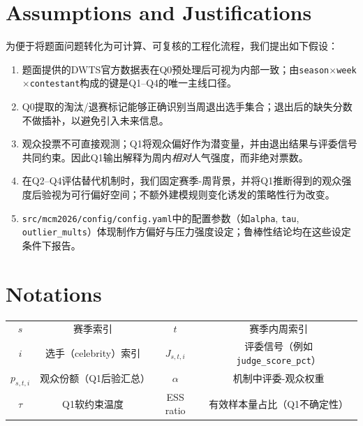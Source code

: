 \newpage%
\section{Assumptions and Justifications}
为便于将题面问题转化为可计算、可复核的工程化流程，我们提出如下假设：

\begin{enumerate}[
	label = (\arabic*),
	itemindent = 0pt,
	labelindent = \parindent,
	labelwidth = 2em,
	labelsep = 5pt,
	leftmargin = 8em]
	\item[\textbf{假设1：}] 题面提供的DWTS官方数据表在Q0预处理后可视为内部一致；由\texttt{season$\times$week$\times$contestant}构成的键是Q1--Q4的唯一主线口径。
	\item[\textbf{假设2：}] Q0提取的淘汰/退赛标记能够正确识别当周退出选手集合；退出后的缺失分数不做插补，以避免引入未来信息。
	\item[\textbf{假设3：}] 观众投票不可直接观测；Q1将观众偏好作为潜变量，并由退出结果与评委信号共同约束。因此Q1输出解释为周内\emph{相对}人气强度，而非绝对票数。
	\item[\textbf{假设4：}] 在Q2--Q4评估替代机制时，我们固定赛季-周背景，并将Q1推断得到的观众强度后验视为可行偏好空间；不额外建模规则变化诱发的策略性行为改变。
	\item[\textbf{假设5：}] \texttt{src/mcm2026/config/config.yaml}中的配置参数（如\texttt{alpha}, \texttt{tau}, \texttt{outlier\_mults}）体现制作方偏好与压力强度设定；鲁棒性结论均在这些设定条件下报告。
\end{enumerate}



\section{Notations}
\begin{center}
	\begin{tabular}{cccc}
		\toprule[1pt] 
		\makebox[0.15\textwidth][c]{Symbol} & \makebox[0.3\textwidth][c]{Description} & \makebox[0.15\textwidth][c]{Symbol} & \makebox[0.3\textwidth][c]{Description} \\  
		\hline
		$s$ & 赛季索引 & $t$ & 赛季内周索引 \\
		$i$ & 选手（celebrity）索引 & $J_{s,t,i}$ & 评委信号（例如\texttt{judge\_score\_pct}） \\
		$p_{s,t,i}$ & 观众份额（Q1后验汇总） & $\alpha$ & 机制中评委-观众权重 \\
		$\tau$ & Q1软约束温度 & ESS ratio & 有效样本量占比（Q1不确定性） \\
		\bottomrule[1pt]
	\end{tabular}
\end{center}
\vspace{-0.5em}


